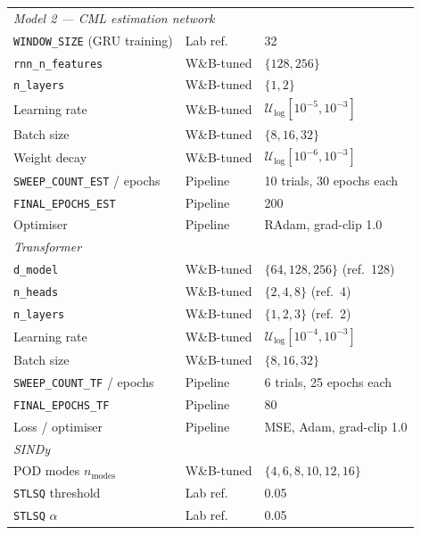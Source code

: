 \documentclass[12pt, a4paper]{article}
\begin{document}
\begin{table}[h]
\begin{tabular}{p{5.5cm}lp{6cm}}
\midrule
\multicolumn{3}{l}{\textit{Model 2 — CML estimation network}} \\
\texttt{WINDOW\_SIZE} (GRU training)     & Lab ref.    & 32 \\
\texttt{rnn\_n\_features}                & W\&B-tuned  & $\{128, 256\}$ \\
\texttt{n\_layers}                       & W\&B-tuned  & $\{1, 2\}$ \\
Learning rate                            & W\&B-tuned  & $\mathcal{U}_{\log}[10^{-5}, 10^{-3}]$ \\
Batch size                               & W\&B-tuned  & $\{8, 16, 32\}$ \\
Weight decay                             & W\&B-tuned  & $\mathcal{U}_{\log}[10^{-6}, 10^{-3}]$ \\
\texttt{SWEEP\_COUNT\_EST} / epochs      & Pipeline    & 10 trials, 30 epochs each \\
\texttt{FINAL\_EPOCHS\_EST}              & Pipeline    & 200 \\
Optimiser                                & Pipeline    & RAdam, grad-clip 1.0 \\
\midrule
\multicolumn{3}{l}{\textit{Transformer}} \\
\texttt{d\_model}                        & W\&B-tuned  & $\{64, 128, 256\}$ (ref.\ 128) \\
\texttt{n\_heads}                        & W\&B-tuned  & $\{2, 4, 8\}$ (ref.\ 4) \\
\texttt{n\_layers}                       & W\&B-tuned  & $\{1, 2, 3\}$ (ref.\ 2) \\
Learning rate                            & W\&B-tuned  & $\mathcal{U}_{\log}[10^{-4}, 10^{-3}]$ \\
Batch size                               & W\&B-tuned  & $\{8, 16, 32\}$ \\
\texttt{SWEEP\_COUNT\_TF} / epochs       & Pipeline    & 6 trials, 25 epochs each \\
\texttt{FINAL\_EPOCHS\_TF}               & Pipeline    & 80 \\
Loss / optimiser                         & Pipeline    & MSE, Adam, grad-clip 1.0 \\
\midrule
\multicolumn{3}{l}{\textit{SINDy}} \\
POD modes $n_{\text{modes}}$             & W\&B-tuned  & $\{4, 6, 8, 10, 12, 16\}$ \\
\texttt{STLSQ} threshold                 & Lab ref.    & 0.05 \\
\texttt{STLSQ} $\alpha$                  & Lab ref.    & 0.05 \\

\end{tabular}
\end{table}
\end{document}
